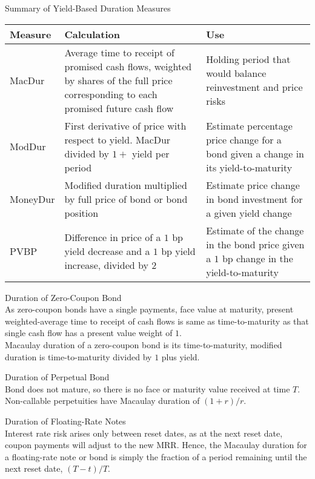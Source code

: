 \begin{flushleft}
Summary of Yield-Based Duration Measures
\begin{tabularx}{\textwidth}{p{5em}|X|X}
\hline
\rowcolor{gray!30}
Measure & Calculation & Use \\
\hline
MacDur & Average time to receipt of promised cash flows, weighted by shares of the full price corresponding to each promised future cash flow & Holding period that would balance reinvestment and price risks\\
\hline
ModDur & First derivative of price with respect to yield. MacDur divided by $1 +$ yield per period & Estimate percentage price change for a bond given a change in its yield-to-maturity \\
\hline
MoneyDur & Modified duration multiplied by full price of bond or bond position & Estimate price change in bond investment for a given yield change \\
\hline
PVBP & Difference in price of a $1$ bp yield decrease and a $1$ bp yield increase, divided by $2$ & Estimate of the change in the bond price given a $1$ bp change in the yield-to-maturity \\
\hline
\end{tabularx}
\end{flushleft}

\begin{remark} Duration of Zero-Coupon Bond\\
As zero-coupon bonds have a single payments, face value at maturity, present weighted-average time to receipt of cash flows is same as time-to-maturity as that single cash flow has a present value weight of $1$.\\
Macaulay duration of a zero-coupon bond is its time-to-maturity, modified duration is time-to-maturity divided by $1$ plus yield.
\end{remark}

\begin{remark} Duration of Perpetual Bond\\
Bond does not mature, so there is no face or maturity value received at time $T$.\\
Non-callable perpetuities have Macaulay duration of $(1+r)/r$.
\end{remark}

\begin{remark} Duration of Floating-Rate Notes\\
Interest rate risk arises only between reset dates, as at the next reset date, coupon payments will adjust to the new MRR. Hence, the Macaulay duration for a floating-rate note or bond is simply the fraction of a period remaining until the next reset date, $(T-t)/T$.
\end{remark}

